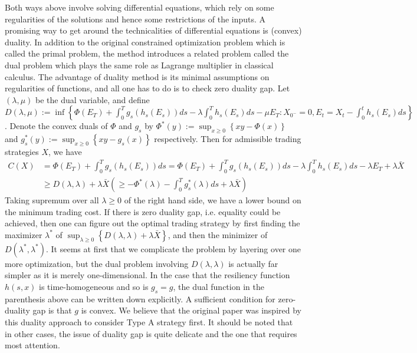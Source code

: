 \documentclass[openany,oneside]{article}
\theoremstyle{definition}
\theoremstyle{remark}
\begin{document}
Both ways above involve solving differential equations, which rely on some regularities of the solutions and hence some restrictions of the inputs. A promising way to get around the technicalities of differential equations is (convex) duality. In addition to the original constrained optimization problem which is called the primal problem, the method introduces a related problem called the dual problem which plays the same role as Lagrange multiplier in classical calculus. The advantage of duality method is its minimal assumptions on regularities of functions, and all one has to do is to check zero duality gap. Let $(\lambda,\mu)$ be the dual variable, and define $D(\lambda,\mu) := \inf \left\{ \Phi(E_T) + \int_0^T g_s(h_s(E_s)) ds - \lambda \int_0^T h_s(E_s) ds - \mu E_T : X_{0^-} =0, E_t = X_t - \int_0^t h_s(E_s) ds \right\}$. Denote the convex duals of $\Phi$ and $g_s$ by $\Phi^\ast(y):=\sup_{x\ge 0}\left\{xy - \Phi(x)\right\}$ and $g_s^\ast(y):=\sup_{x\ge 0}\left\{xy - g_s(x)\right\}$ respectively. Then for admissible trading strategies $X$, we have
\begin{align*}
C(X) &= \Phi(E_T) + \int_0^T g_s(h_s(E_s)) ds = \Phi(E_T) + \int_0^T g_s(h_s(E_s)) ds - \lambda \int_0^T h_s(E_s) ds - \lambda E_T + \lambda \bar{X} \\
& \ge D(\lambda, \lambda) + \lambda \bar{X} \left( \ge -\Phi^\ast(\lambda) - \int_0^T g_s^\ast(\lambda) ds + \lambda \bar{X} \right)
\end{align*}
Taking supremum over all $\lambda \ge 0$ of the right hand side, we have a lower bound on the minimum trading cost. If there is zero duality gap, i.e. equality could be achieved, then one can figure out the optimal trading strategy by first finding the maximizer $\lambda^\ast$ of $\sup_{\lambda \ge 0}\left\{D(\lambda,\lambda) + \lambda \bar{X} \right\}$, and then the minimizer of $D(\lambda^\ast, \lambda^\ast)$. It seems at first that we complicate the problem by layering over one more optimization, but the dual problem involving $D(\lambda,\lambda)$ is actually far simpler as it is merely one-dimensional. In the case that the resiliency function $h(s,x)$ is time-homogeneous and so is $g_s = g$, the dual function in the parenthesis above can be written down explicitly. A sufficient condition for zero-duality gap is that $g$ is convex. We believe that the original paper was inspired by this duality approach to consider Type A strategy first. It should be noted that in other cases, the issue of duality gap is quite delicate and the one that requires most attention.
\end{document}
